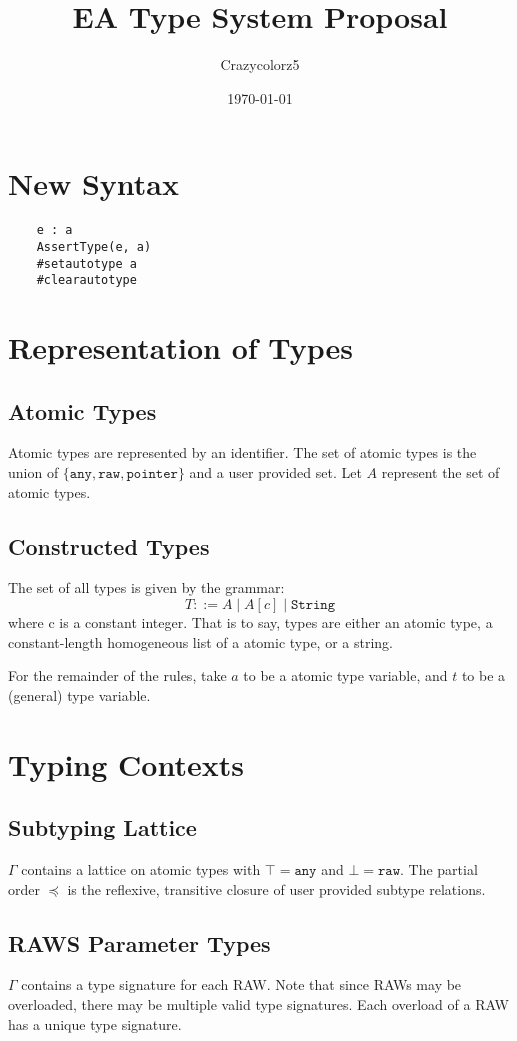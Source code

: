 \documentclass[10pt,a4paper]{article}
\title{EA Type System Proposal}
\date{\today}
\author{Crazycolorz5}
\begin{document}
	\maketitle

\section{New Syntax}
\begin{verbatim}
	e : a
	AssertType(e, a)
	#setautotype a
	#clearautotype
\end{verbatim}

\section{Representation of Types}
\subsection{Atomic Types}
Atomic types are represented by an identifier. The set of atomic types is the union of $\{ \texttt{any}, \texttt{raw}, \texttt{pointer} \}$ and a user provided set. Let $A$ represent the set of atomic types.

\subsection{Constructed Types}
The set of all types is given by the grammar:
$$
T ::= A \mid A[c] \mid \texttt{String}
$$
where c is a constant integer.
That is to say, types are either an atomic type, a constant-length homogeneous list of a atomic type, or a string. 

For the remainder of the rules, take $a$ to be a atomic type variable, and $t$ to be a (general) type variable.

\section{Typing Contexts}
\subsection{Subtyping Lattice}
$\Gamma$ contains a lattice on atomic types with $\top = \texttt{any}$ and $\bot = \texttt{raw}$. The partial order $\preceq$ is the reflexive, transitive closure of user provided subtype relations.

\subsection{RAWS Parameter Types}
$\Gamma$ contains a type signature for each RAW. Note that since RAWs may be overloaded, there may be multiple valid type signatures. Each overload of a RAW has a unique type signature.
\end{document}
